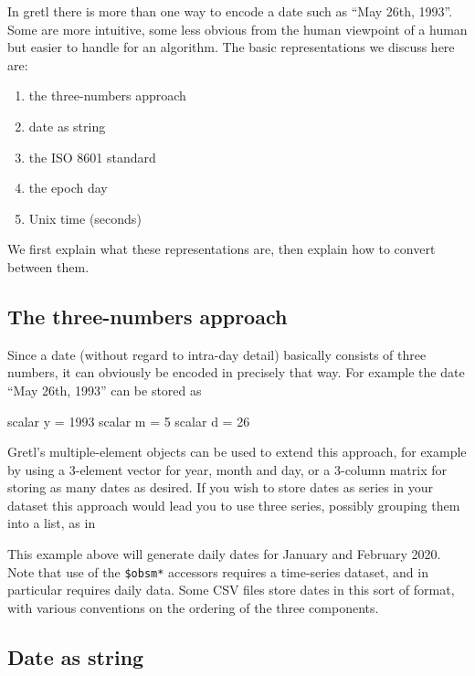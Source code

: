 In gretl there is more than one way to encode a date such as ``May
26th, 1993''. Some are more intuitive, some less obvious from the
human viewpoint of a human but easier to handle for an algorithm. The
basic representations we discuss here are:
\begin{enumerate}
\item the three-numbers approach
\item date as string
\item the ISO 8601 standard
\item the epoch day
\item Unix time (seconds)
\end{enumerate}
We first explain what these representations are, then explain how
to convert between them.

\subsection{The three-numbers approach}
\label{sec:cal-3numbers}

Since a date (without regard to intra-day detail) basically consists
of three numbers, it can obviously be encoded in precisely that way.
For example the date ``May 26th, 1993'' can be stored as
\begin{code}
  scalar y = 1993
  scalar m = 5
  scalar d = 26
\end{code}

Gretl's multiple-element objects can be used to extend this approach,
for example by using a 3-element vector for year, month and day, or a
3-column matrix for storing as many dates as desired. If you wish to
store dates as series in your dataset this approach would lead you to
use three series, possibly grouping them into a list, as in
This example above will generate daily dates for January and February
2020. Note that use of the \verb|$obsm*| accessors requires a
time-series dataset, and  in particular requires
daily data. Some CSV files store dates in this sort of format, with
various conventions on the ordering of the three components.

\subsection{Date as string}
\label{sec:cal-generic-string}

